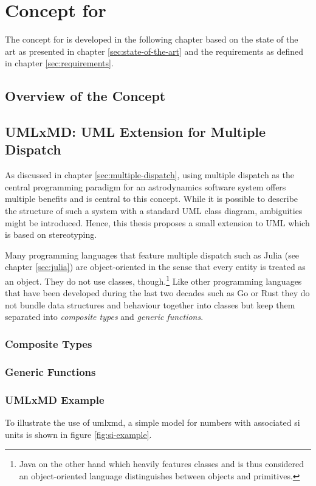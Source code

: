 \chapter{Concept for \topic}
\label{sec:concept}

The concept for \topic is developed in the following chapter based on the state of the art as presented in chapter \ref{sec:state-of-the-art} and the requirements as defined in chapter \ref{sec:requirements}.

\section{Overview of the Concept}
\label{sec:overview-concept}

\section{UMLxMD: UML Extension for Multiple Dispatch}
\label{sec:umlxmd}
As discussed in chapter \ref{sec:multiple-dispatch}, using multiple dispatch as the central programming paradigm for an astrodynamics software system offers multiple benefits and is central to this concept.
While it is possible to describe the structure of such a system with a standard UML class diagram, ambiguities might be introduced.
Hence, this thesis proposes a small extension to UML which is based on stereotyping.

Many programming languages that feature multiple dispatch such as Julia (see chapter \ref{sec:julia}) are object-oriented in the sense that every entity is treated as an object.
They do not use classes, though.\footnote{Java on the other hand which heavily features classes and is thus considered an object-oriented language distinguishes between objects and primitives.}
Like other programming languages that have been developed during the last two decades such as Go or Rust they do not bundle data structures and behaviour together into classes but keep them separated into \emph{composite types} and \emph{generic functions}.
\subsection{Composite Types}
\label{sec:composite-types}


\subsection{Generic Functions}
\label{sec:generic-functions}

\subsection{UMLxMD Example}
\label{sec:umlxmd-example}
To illustrate the use of \ac{umlxmd}, a simple model for numbers with associated \ac{si} units is shown in figure \ref{fig:si-example}.


